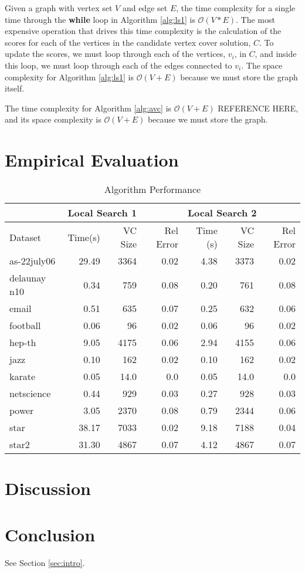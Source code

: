 \documentclass[sigconf]{acmart}
\newcommand{\bigo}[1]{\mathcal{O}(#1)}
\begin{document}
Given a graph with vertex set $V$ and edge set $E$, the time complexity for a single time through the \textbf{while} loop in Algorithm \ref{alg:ls1} is $\bigo{V * E}$. The most expensive operation that drives this time complexity is the calculation of the scores for each of the vertices in the candidate vertex cover solution, $C$. To update the scores, we must loop through each of the vertices, $v_i$, in $C$, and inside this loop, we must loop through each of the edges connected to $v_i$. The space complexity for Algorithm \ref{alg:ls1} is $\bigo{V + E}$ because we must store the graph itself.

The time complexity for Algorithm \ref{alg:avc} is $\bigo{V + E}$ REFERENCE HERE, and its space complexity is $\bigo{V + E}$ because we must store the graph.  

\section{Empirical Evaluation}

\begin{table}[h]
	\caption{Algorithm Performance}
	\label{algperf}
	\begin{tabular}{lrrrrrr}
		\toprule
		& \multicolumn{3}{l}{Local Search 1} & \multicolumn{3}{l}{Local Search 2} \\ \midrule
		Dataset & Time(s)    & VC Size   & Rel Error  & Time (s)   & VC Size   & Rel Error  \\ \midrule
		as-22july06    & 29.49   & 3364      & 0.02   & 4.38   & 3373      & 0.02   \\
		delaunay n10    & 0.34   & 759      & 0.08   & 0.20   & 761      & 0.08   \\
		email    & 0.51   & 635      & 0.07   & 0.25   & 632      & 0.06   \\
		football    & 0.06   & 96      & 0.02   & 0.06   & 96      & 0.02   \\
		hep-th    & 9.05   & 4175      & 0.06   & 2.94   & 4155      & 0.06   \\
		jazz    & 0.10   & 162      & 0.02   & 0.10   & 162      & 0.02   \\
		karate    & 0.05   & 14.0      & 0.0   & 0.05   & 14.0      & 0.0   \\
		netscience    & 0.44   & 929      & 0.03   & 0.27   & 928      & 0.03   \\
		power    & 3.05   & 2370      & 0.08   & 0.79   & 2344      & 0.06   \\
		star    & 38.17   & 7033      & 0.02   & 9.18   & 7188      & 0.04   \\
		star2    & 31.30   & 4867      & 0.07   & 4.12   & 4867      & 0.07   \\
		\bottomrule
	\end{tabular}
\end{table}

\section{Discussion}

\section{Conclusion}
See Section \ref{sec:intro}.


 
\end{document}
